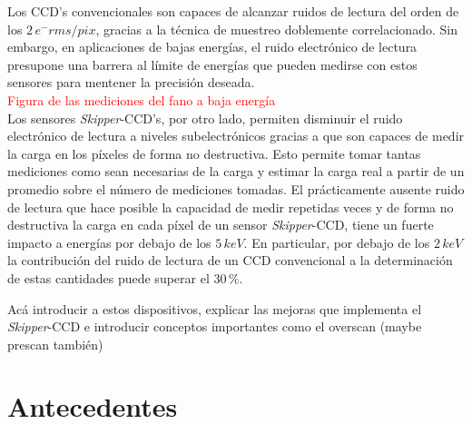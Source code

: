 Los CCD's convencionales son capaces de alcanzar ruidos de lectura del orden de los $2\,e^{-}\si{rms/pix}$, gracias a la técnica de muestreo doblemente correlacionado. Sin embargo, en aplicaciones de bajas energías, el ruido electrónico de lectura presupone una barrera al límite de energías que pueden medirse con estos sensores para mentener la precisión deseada.\\
\textcolor{red}{Figura de las mediciones del fano a baja energía}\\
\indent Los sensores \textit{Skipper}-CCD's, por otro lado, permiten disminuir el ruido electrónico de lectura a niveles subelectrónicos gracias a que son capaces de medir la carga en los píxeles de forma no destructiva. Esto permite tomar tantas mediciones como sean necesarias de la carga y estimar la carga real a partir de un promedio sobre el número de mediciones tomadas. El prácticamente ausente ruido de lectura que hace posible la capacidad de medir repetidas veces y de forma no destructiva la carga en cada píxel de un sensor \textit{Skipper}-CCD, tiene un fuerte impacto a energías por debajo de los $5\,\si{keV}$. En particular, por debajo de los $2\,\si{keV}$ la contribución del ruido de lectura de un CCD convencional a la determinación de estas cantidades puede superar el $30\,\%$. %


Acá introducir a estos dispositivos, explicar las mejoras que implementa el \textit{Skipper}-CCD e introducir conceptos importantes como el overscan (maybe prescan también)
\section{Antecedentes}

